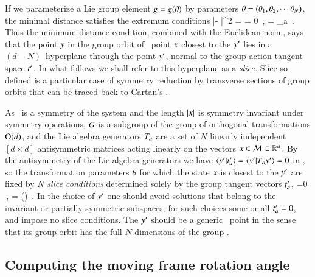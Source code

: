 If we parameterize a Lie group element $g=g({\bf \theta})$ by
parameters ${\bf \theta} = ({\bf \theta}_1,{\bf \theta}_2,\cdots{\bf \theta}_N)$, the minimal
distance satisfies the extremum conditions
\beq
{} |\ssp - \LieEl\slicep|^2
   =
   = 0
    \,,\qquad
	   = \Lg_a \slicep
\,.
\label{PCsectQ}
\eeq
Thus the minimum distance condition, combined with the Euclidean norm, says
that the point $y$ in the group orbit of \statesp\ point $x$
closest to the {\template} ${y'}$ lies in a $(d\!-\!N)$\dmn\ hyperplane
through the point ${y'}$, normal to the group action tangent space
$t'_{}$. In what follows we shall refer to this hyperplane as a
\emph{slice.} Slice so defined is a particular case of symmetry reduction
by transverse sections of group
orbits that can be traced back to
Cartan's \mframes{}.

As \Group\ is a symmetry of the system and the length $|x|$ is
symmetry invariant under symmetry operations, $G$ is a subgroup of
the group of orthogonal transformations $\textrm{O}(d)$, and the Lie algebra
{generators} $T_a$ are a set of $N$ linearly independent
$[d\!\times\!d]$ antisymmetric matrices acting linearly on the {\statesp}
vectors $x \in {\cal M} \subset \mathbb{R}^d$. By the antisymmetry of the Lie
algebra generators we have $\braket{\slicep}{\sliceTan{a}} =
\braket{\slicep}{\Lg_{a}\slicep}=0$ in , so the
transformation parameters ${\bf \theta}$ for which the state $x$ is closest
to the {\template} ${y'}$ are fixed by $N$ \emph{slice conditions} determined
solely by the group tangent vectors $t'_{a}$,
\beq
{} =0
    \,,\qquad
\sspRed = \LieEl(\gSpace) \ssp
\,.
In the choice of ${y'}$ one should avoid solutions that belong to the
invariant or partially symmetric subspaces; for such choices some or all
$t'_{a}=0$, and impose no slice conditions. The {\template}
${y'}$ should be a generic \statesp\ point in the sense that its group
orbit has the full $N$-dimensions of the group \Group.

\subsection{Computing the moving frame rotation angle}
\label{exam:CLErotAngle}

